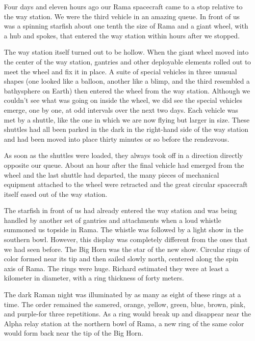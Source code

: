 \documentclass[]{article}
\begin{document}
{Four days and eleven hours ago our Rama spacecraft came to a stop relative to the way station.  We were the third vehicle in an amazing queue.  In front of us was a spinning starfish about one tenth the size of Rama and a giant wheel, with a hub and spokes, that entered the way station within hours after we stopped.

The way station itself turned out to be hollow.  When the giant wheel moved into the center of the way station, gantries and other deployable elements rolled out to meet the wheel and fix it in place.  A suite of special vehicles in three unusual shapes (one looked like a balloon, another like a blimp, and the third resembled a bathysphere on Earth) then entered the wheel from the way station.  Although we couldn’t see what was going on inside the wheel, we did see the special vehicles emerge, one by one, at odd intervals over the next two days.  Each vehicle was met by a shuttle, like the one in which we are now flying but larger in size.  These shuttles had all been parked in the dark in the right-hand side of the way station and had been moved into place thirty minutes or so before the rendezvous.

As soon as the shuttles were loaded, they always took off in a direction directly opposite our queue.  About an hour after the final vehicle had emerged from the wheel and the last shuttle had departed, the many pieces of mechanical equipment attached to the wheel were retracted and the great circular spacecraft itself eased out of the way station.

The starfish in front of us had already entered the way station and was being handled by another set of gantries and attachments when a loud whistle summoned us topside in Rama.  The whistle was followed by a light show in the southern bowl.  However, this display was completely different from the ones that we had seen before.  The Big Horn was the star of the new show.  Circular rings of color formed near its tip and then sailed slowly north, centered along the spin axis of Rama.  The rings were huge.  Richard estimated they were at least a kilometer in diameter, with a ring thickness of forty meters.

The dark Raman night was illuminated by as many as eight of these rings at a time.  The order remained the samered, orange, yellow, green, blue, brown, pink, and purple-for three repetitions.  As a ring would break up and disappear near the Alpha relay station at the northern bowl of Rama, a new ring of the same color would form back near the tip of the Big Horn.

}
\end{document}
